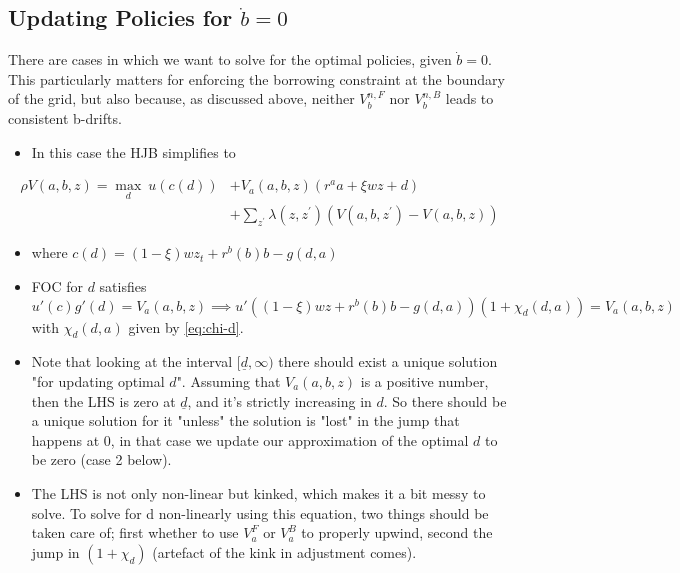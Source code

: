 \documentclass[11pt]{article}
\begin{document}
\subsection{Updating Policies for \(\dot{b}=0\)}
\label{sec:org0ad74ce}
There are cases in which we want to solve for the optimal policies, given \(\dot{b}=0\). This particularly matters for enforcing the borrowing constraint at the boundary of the grid, but also because, as discussed above, neither \(V_b^{n,F}\) nor \(V_b^{n,B}\) leads to consistent b-drifts. 
\begin{itemize}
\item In this case the HJB simplifies to
\end{itemize}
\begin{align}
\label{eq:hjb-d}
\rho V(a,b,z)=\operatorname*{max}_{d}\ u(c(d))& + V_{a}(a,b,z)(r^{a}a+\xi w z+d) \nonumber \\
&+\sum_{z^{\prime}}\lambda(z,z^{\prime})(V(a,b,z^{\prime})-V(a,b,z))
\end{align}
\begin{itemize}
\item where \(c(d)=(1-\xi)w z_{t}+r^{b}(b)b-g(d,a)\)
\item FOC for \(d\) satisfies \[u'(c)g'(d) = V_a(a,b,z) \implies u'\left((1-\xi)w z+r^{b}(b)b-g(d,a) \right) \left( 1+\chi_{d}(d,a) \right) = V_a(a,b,z)\] with \(\chi_d(d,a)\) given by \eqref{eq:chi-d}.
\item Note that looking at the interval \([\underline{d}, \infty)\) there should exist a unique solution "for updating optimal \(d\)". Assuming that \(V_a(a,b,z)\) is a positive number, then the LHS is zero at \(\underline{d}\), and it's strictly increasing in \(d\). So there should be a unique solution for it "unless" the solution is "lost" in the jump that happens at 0, in that case we update our approximation of the optimal \(d\) to be zero (case 2 below).
\item The LHS is not only non-linear but kinked, which makes it a bit messy to solve. To solve for d non-linearly using this equation, two things should be taken care of; first whether to use \(V_a^F\) or \(V_a^B\) to properly upwind, second the jump in \((1+\chi_d)\) (artefact of the kink in adjustment comes).
\end{itemize}
\end{document}
